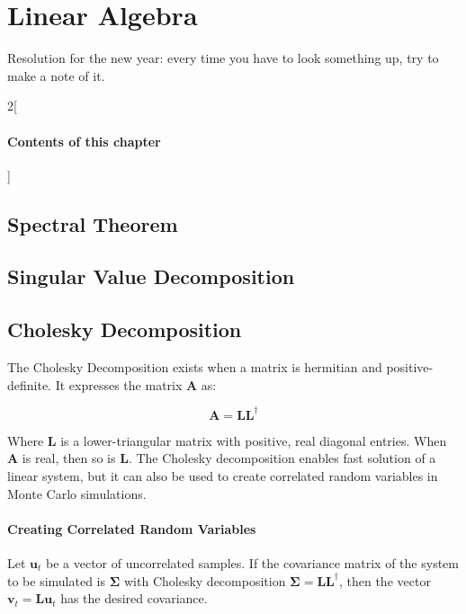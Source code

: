\chapter{Linear Algebra}

Resolution for the new year: every time you have to look something up, try to make a note of it.

\begin{multicols}{2}[\subsubsection*{Contents of this chapter}]
\end{multicols}

\section{Spectral Theorem}

\section{Singular Value Decomposition}




\section{Cholesky Decomposition}
\label{sec:cholesky}

The Cholesky Decomposition exists when a matrix is hermitian and positive-definite. It expresses the matrix $\mathbf{A}$ as:

\begin{equation}
\mathbf{A} = \mathbf{L}\mathbf{L^\dagger}
\end{equation}

Where $\mathbf{L}$ is a lower-triangular matrix with positive, real diagonal entries. When $\mathbf{A}$ is real, then so is $\mathbf{L}$. The Cholesky decomposition enables fast solution of a linear system, but it can also be used to create correlated random variables in Monte Carlo simulations. 

\subsubsection{Creating Correlated Random Variables}
Let $\mathbf{u}_t$ be a vector of uncorrelated samples. If the covariance matrix of the system to be simulated is  $\mathbf{\Sigma}$ with Cholesky decomposition $\mathbf{\Sigma} = \mathbf{LL}^\dagger$, then the vector $\mathbf{v}_t = \mathbf{Lu}_t$ has the desired covariance.

